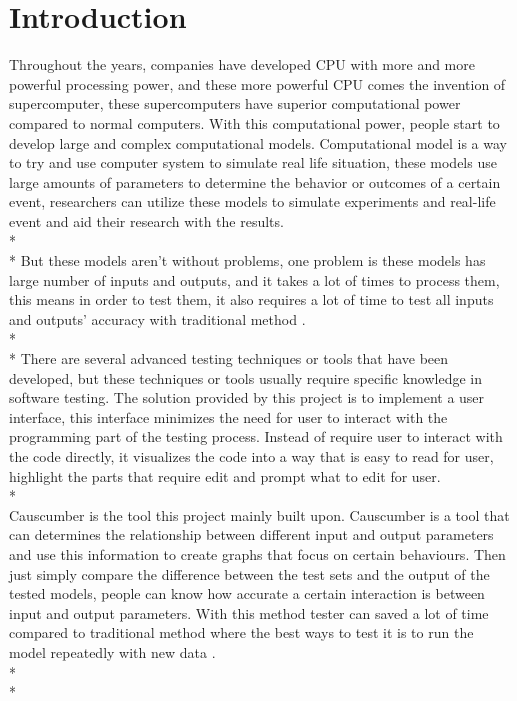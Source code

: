 \chapter{Introduction}

Throughout the years, companies have developed CPU with more and more powerful processing power, and these more powerful CPU comes the invention of supercomputer, these supercomputers have superior computational power compared to normal computers. With this computational power, people start to develop large and complex computational models. Computational model is a way to try and use computer system to simulate real life situation, these models use large amounts of parameters to determine the behavior or outcomes of a certain event, researchers can utilize these models to simulate experiments and real-life event \cite{Reference1} and aid their research with the results.\\*\\*
But these models aren’t without problems, one problem is these models has large number of inputs and outputs, and it takes a lot of times to process them, this means in order to test them, it also requires a lot of time to test all inputs and outputs’ accuracy with traditional method \cite{Reference2}. \\*\\*
There are several advanced testing techniques or tools that have been developed, but these techniques or tools usually require specific knowledge in software testing. The solution provided by this project is to implement a user interface, this interface minimizes the need for user to interact with the programming part of the testing process. Instead of require user to interact with the code directly, it visualizes the code into a way that is easy to read for user, highlight the parts that require edit and prompt what to edit for user.\\*\\
Causcumber is the tool this project mainly built upon. Causcumber is a tool that can determines the relationship between different input and output parameters and use this information to create graphs that focus on certain behaviours. Then just simply compare the difference between the test sets and the output of the tested models, people can know how accurate a certain interaction is between input and output parameters. With this method tester can saved a lot of time compared to traditional method where the best ways to test it is to run the model repeatedly with new data \cite{Reference3}. \\*\\*

